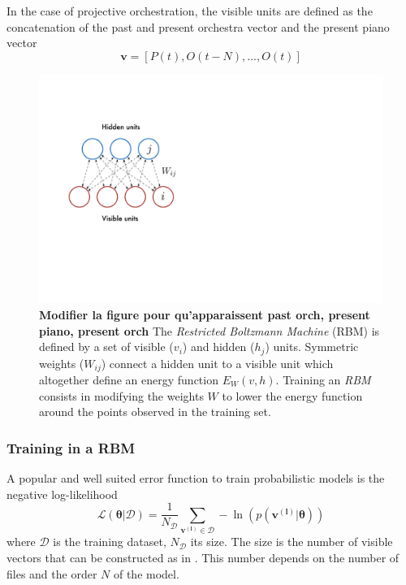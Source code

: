 \documentclass{article}
\begin{document}
In the case of projective orchestration, the visible units are defined as the concatenation of the past and present orchestra vector and the present piano vector
\begin{equation}
\label{eq:visible_rbm}
\bm{v} = \left[P(t),O(t-N),...,O(t)\right]
\end{equation}
\begin{figure}[h]
\centering
\includegraphics[scale=0.6]{RBM}
\caption{\textbf{Modifier la figure pour qu'apparaissent past orch, present piano, present orch}
The \textit{Restricted Boltzmann Machine} (RBM) is defined by a set of visible ($v_{i}$) and hidden ($h_{j}$) units. Symmetric weights ($W_{ij}$) connect a hidden unit to a visible unit which altogether define an energy function $E_{W}(v,h)$. Training an \textit{RBM} consists in modifying the weights $W$ to lower the energy function around the points observed in the training set.}
\label{fig:RBM}
\end{figure}

\subsubsection{Training in a RBM}
A popular and well suited error function to train probabilistic models is the negative log-likelihood 
\begin{equation}
\label{eq:likelihood}
\mathcal{L(\bm{\theta}|\mathcal{D})}  = \frac{1}{N_{\mathcal{D}}} \sum_{\bm{v^{(l)}} \in \mathcal{D}} - \ln \left( p(\bm{v^{(l)}}|\bm{\theta})\right)
\end{equation}
where $\mathcal{D}$ is the training dataset, $N_{\mathcal{D}}$ its size. The size is the number of visible vectors that can be constructed as in . This number depends on the number of files and the order $N$ of the model.
\end{document}
